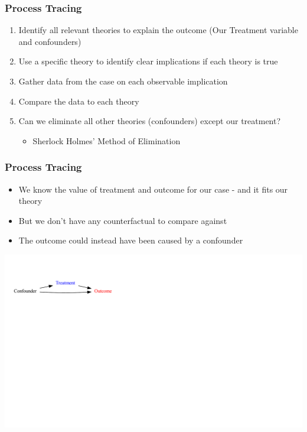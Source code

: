 \documentclass[xcolor=x11names,compress]{beamer}\usepackage[]{graphicx}\usepackage[]{color}
\newenvironment{knitrout}{}{} %
\renewcommand{\(}{\begin{columns}}
\renewcommand{\)}{\end{columns}}
\newcommand{\<}[1]{\begin{column}{#1}}
\renewcommand{\>}{\end{column}}
\begin{document}
\begin{frame}
\frametitle{Process Tracing}
\begin{enumerate}
\item Identify all relevant theories to explain the outcome (Our Treatment variable and confounders)
\pause
\item Use a specific theory to identify clear implications if each theory is true
\pause
\item Gather data from the case on each observable implication
\pause
\item Compare the data to each theory
\pause
\item Can we eliminate all other theories (confounders) except our treatment?
\begin{itemize}
\item Sherlock Holmes' Method of Elimination
\end{itemize}
\end{enumerate}
\end{frame}

\begin{frame}
\frametitle{Process Tracing}
\begin{itemize}
\item We know the value of treatment and outcome for our case - and it fits our theory
\pause
\item But we don't have any counterfactual to compare against
\pause
\item The outcome could instead have been caused by a confounder
\end{itemize}
\begin{knitrout}
\color{fgcolor}
\includegraphics[width=1.8\linewidth]{figure/Dag1-1} 

\end{knitrout}
\end{frame}
\end{document}

